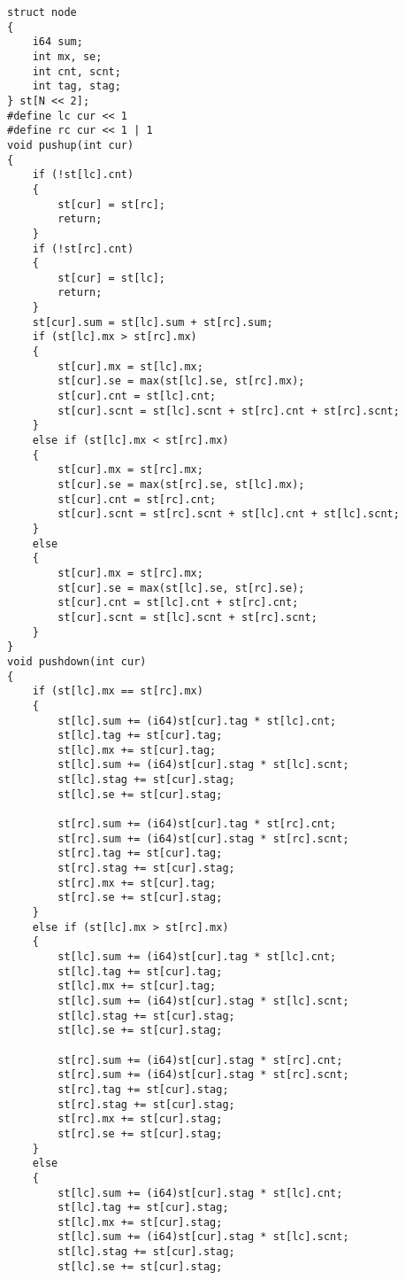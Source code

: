 \documentclass[a4paper]{ctexart}
\begin{document}
\begin{lstlisting}
struct node
{
    i64 sum;
    int mx, se;
    int cnt, scnt;
    int tag, stag;
} st[N << 2];
#define lc cur << 1
#define rc cur << 1 | 1
void pushup(int cur)
{
    if (!st[lc].cnt)
    {
        st[cur] = st[rc];
        return;
    }
    if (!st[rc].cnt)
    {
        st[cur] = st[lc];
        return;
    }
    st[cur].sum = st[lc].sum + st[rc].sum;
    if (st[lc].mx > st[rc].mx)
    {
        st[cur].mx = st[lc].mx;
        st[cur].se = max(st[lc].se, st[rc].mx);
        st[cur].cnt = st[lc].cnt;
        st[cur].scnt = st[lc].scnt + st[rc].cnt + st[rc].scnt;
    }
    else if (st[lc].mx < st[rc].mx)
    {
        st[cur].mx = st[rc].mx;
        st[cur].se = max(st[rc].se, st[lc].mx);
        st[cur].cnt = st[rc].cnt;
        st[cur].scnt = st[rc].scnt + st[lc].cnt + st[lc].scnt;
    }
    else
    {
        st[cur].mx = st[rc].mx;
        st[cur].se = max(st[lc].se, st[rc].se);
        st[cur].cnt = st[lc].cnt + st[rc].cnt;
        st[cur].scnt = st[lc].scnt + st[rc].scnt;
    }
}
void pushdown(int cur)
{
    if (st[lc].mx == st[rc].mx)
    {
        st[lc].sum += (i64)st[cur].tag * st[lc].cnt;
        st[lc].tag += st[cur].tag;
        st[lc].mx += st[cur].tag;
        st[lc].sum += (i64)st[cur].stag * st[lc].scnt;
        st[lc].stag += st[cur].stag;
        st[lc].se += st[cur].stag;
    
        st[rc].sum += (i64)st[cur].tag * st[rc].cnt;
        st[rc].sum += (i64)st[cur].stag * st[rc].scnt;
        st[rc].tag += st[cur].tag;
        st[rc].stag += st[cur].stag;
        st[rc].mx += st[cur].tag;
        st[rc].se += st[cur].stag;
    }
    else if (st[lc].mx > st[rc].mx)
    {
        st[lc].sum += (i64)st[cur].tag * st[lc].cnt;
        st[lc].tag += st[cur].tag;
        st[lc].mx += st[cur].tag;
        st[lc].sum += (i64)st[cur].stag * st[lc].scnt;
        st[lc].stag += st[cur].stag;
        st[lc].se += st[cur].stag;
    
        st[rc].sum += (i64)st[cur].stag * st[rc].cnt;
        st[rc].sum += (i64)st[cur].stag * st[rc].scnt;
        st[rc].tag += st[cur].stag;
        st[rc].stag += st[cur].stag;
        st[rc].mx += st[cur].stag;
        st[rc].se += st[cur].stag;
    }
    else
    {
        st[lc].sum += (i64)st[cur].stag * st[lc].cnt;
        st[lc].tag += st[cur].stag;
        st[lc].mx += st[cur].stag;
        st[lc].sum += (i64)st[cur].stag * st[lc].scnt;
        st[lc].stag += st[cur].stag;
        st[lc].se += st[cur].stag;
    

\end{lstlisting}
\end{document}
